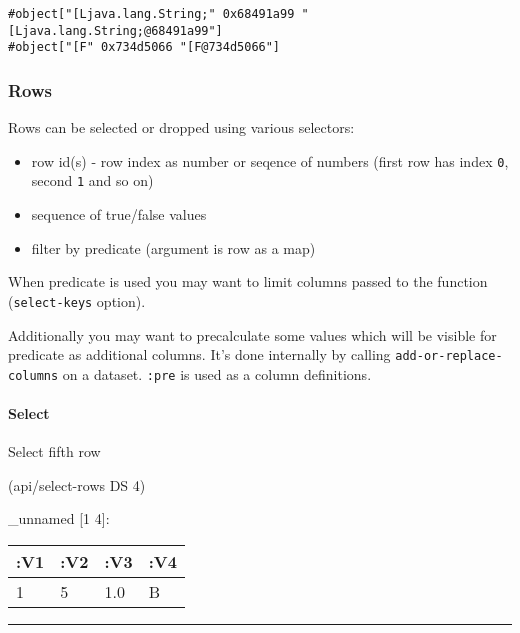 \documentclass[]{article}
\newenvironment{Shaded}{\begin{snugshade}}{\end{snugshade}}
\newcommand{\DecValTok}[1]{\textcolor[rgb]{0.00,0.00,0.81}{#1}}
\newcommand{\NormalTok}[1]{#1}
\providecommand{\tightlist}{%
  \setlength{\itemsep}{0pt}\setlength{\parskip}{0pt}}
\let\oldparagraph\paragraph
\renewcommand{\paragraph}[1]{\oldparagraph{#1}\mbox{}}
\begin{document}
\begin{verbatim}
#object["[Ljava.lang.String;" 0x68491a99 "[Ljava.lang.String;@68491a99"]
#object["[F" 0x734d5066 "[F@734d5066"]
\end{verbatim}

\hypertarget{rows}{%
\subsubsection{Rows}\label{rows}}

Rows can be selected or dropped using various selectors:

\begin{itemize}
\tightlist
\item
  row id(s) - row index as number or seqence of numbers (first row has
  index \texttt{0}, second \texttt{1} and so on)
\item
  sequence of true/false values
\item
  filter by predicate (argument is row as a map)
\end{itemize}

When predicate is used you may want to limit columns passed to the
function (\texttt{select-keys} option).

Additionally you may want to precalculate some values which will be
visible for predicate as additional columns. It's done internally by
calling \texttt{add-or-replace-columns} on a dataset. \texttt{:pre} is
used as a column definitions.

\hypertarget{select-1}{%
\paragraph{Select}\label{select-1}}

Select fifth row

\begin{Shaded}
\begin{Highlighting}[]
\NormalTok{(api/select-rows DS }\DecValTok{4}\NormalTok{)}
\end{Highlighting}
\end{Shaded}

\_unnamed {[}1 4{]}:

\begin{longtable}[]{@{}llll@{}}
\toprule
:V1 & :V2 & :V3 & :V4\tabularnewline
\midrule
\endhead
1 & 5 & 1.0 & B\tabularnewline
\bottomrule
\end{longtable}

\begin{center}\rule{0.5\linewidth}{0.5pt}\end{center}
\end{document}
